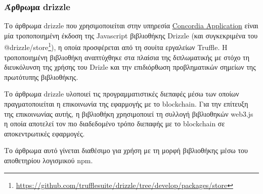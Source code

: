 \subsubsection{Άρθρωμα drizzle} \label{subsubsection:4-3-1-eth-drizzle-unit}

Το άρθρωμα drizzle που χρησιμοποιείται στην υπηρεσία \hyperref[subsection:4-3-2-concordia-application-service]{Concordia Application} είναι μία τροποποιημένη έκδοση της Javascript βιβλιοθήκης Drizzle (και συγκεκριμένα του @drizzle/store\footnote{\url{https://github.com/trufflesuite/drizzle/tree/develop/packages/store}}), η οποία προσφέρεται από τη σουίτα εργαλείων Truffle. Η τροποποιημένη βιβλιοθήκη αναπτύχθηκε στα πλαίσια της διπλωματικής με στόχο τη διευκόλυνση της χρήσης του Drizle και την επιδιόρθωση προβληματικών σημείων της πρωτότυπης βιβλιοθήκης.

Το άρθρωμα drizzle υλοποιεί τις προγραμματιστικές διεπαφές μέσω των οποίων πραγματοποιείται η επικοινωνία της εφαρμογής με το blockchain. Για την επίτευξη της επικοινωνίας αυτής, η βιβλιοθήκη χρησιμοποιεί τη συλλογή βιβλιοθηκών web3.js η οποία αποτελεί τον πιο διαδεδομένο τρόπο διεπαφής με το blockchain σε αποκεντρωτικές εφαρμογές.

Το άρθρωμα αυτό γίνεται διαθέσιμο για χρήση με τη μορφή βιβλιοθήκης μέσω του αποθετηρίου λογισμικού npm.